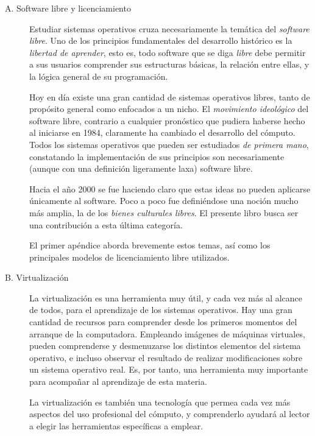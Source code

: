 \documentclass[11pt,fleqn]{book} %
\begin{document}
\begin{description}
\item[A. Software libre y licenciamiento] Estudiar sistemas operativos
     cruza necesariamente la temática del \emph{software libre}. Uno de los
     principios fundamentales del desarrollo histórico es la \emph{libertad      de aprender}, esto es, todo software que se diga \emph{libre} debe
     permitir a sus usuarios comprender sus estructuras básicas, la
     relación entre ellas, y la lógica general de su programación.

     Hoy en día existe una gran cantidad de sistemas operativos
     libres, tanto de propósito general como enfocados a un nicho. El
     \emph{movimiento ideológico} del software libre, contrario a cualquier
     pronóstico que pudiera haberse hecho al iniciarse en 1984,
     claramente ha cambiado el desarrollo del cómputo. Todos los
     sistemas operativos que pueden ser estudiados \emph{de primera mano},
     constatando la implementación de sus principios son
     necesariamente (aunque con una definición ligeramente laxa)
     software libre.

     Hacia el año 2000 se fue haciendo claro que estas ideas no pueden
     aplicarse únicamente al software. Poco a poco fue definiéndose
     una noción mucho más amplia, la de los \emph{bienes culturales      libres}. El presente libro busca ser una contribución a esta
     última categoría.

     El primer apéndice aborda brevemente estos temas, así como los
     principales modelos de licenciamiento libre utilizados.
\item[B. Virtualización] La virtualización es una herramienta muy útil,
     y cada vez más al alcance de todos, para el aprendizaje de los
     sistemas operativos. Hay una gran cantidad de recursos para
     comprender desde los primeros momentos del arranque de la
     computadora. Empleando imágenes de máquinas virtuales, pueden
     comprenderse y desmenuzarse los distintos elementos del sistema
     operativo, e incluso observar el resultado de realizar
     modificaciones sobre un sistema operativo real. Es, por tanto,
     una herramienta muy importante para acompañar al aprendizaje de
     esta materia.

     La virtualización es también una tecnología que permea cada vez
     más aspectos del uso profesional del cómputo, y comprenderlo
     ayudará al lector a elegir las herramientas específicas a
     emplear.


\end{description}
\end{document}
